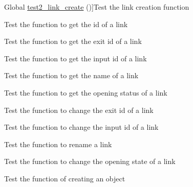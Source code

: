 \begin{DoxyRefList}
%
Global \hyperlink{link__test_8c_a24b5463da176c3e578b0a0fa8bb1f9f0}{test2\+\_\+link\+\_\+create} ()]Test the link creation function  
\item[\label{test__test000093}%
\Hypertarget{test__test000093}%
Global \hyperlink{link__test_8c_a0f967a1782dd7264e73ad428d22d125d}{test2\+\_\+link\+\_\+get\+\_\+id} ()]Test the function to get the id of a link  
\item[\label{test__test000098}%
\Hypertarget{test__test000098}%
Global \hyperlink{link__test_8c_a26e61cc0a08c97282384a56212168d5a}{test2\+\_\+link\+\_\+get\+\_\+id1} ()]Test the function to get the exit id of a link  
\item[\label{test__test000100}%
\Hypertarget{test__test000100}%
Global \hyperlink{link__test_8c_ad9c803361f84a47b5e3f0d475eeb28d0}{test2\+\_\+link\+\_\+get\+\_\+id2} ()]Test the function to get the input id of a link  
\item[\label{test__test000102}%
\Hypertarget{test__test000102}%
Global \hyperlink{link__test_8c_a4efc6cfcdc210e2803f9d285734c571e}{test2\+\_\+link\+\_\+get\+\_\+name} ()]Test the function to get the name of a link  
\item[\label{test__test000095}%
\Hypertarget{test__test000095}%
Global \hyperlink{link__test_8c_a52754541d1357c38da41b0c1b120d5ed}{test2\+\_\+link\+\_\+is\+\_\+open} ()]Test the function to get the opening status of a link  
\item[\label{test__test000086}%
\Hypertarget{test__test000086}%
Global \hyperlink{link__test_8c_acc401625c94cf6dc9ab66aa974804397}{test2\+\_\+link\+\_\+set\+\_\+id1} ()]Test the function to change the exit id of a link  
\item[\label{test__test000088}%
\Hypertarget{test__test000088}%
Global \hyperlink{link__test_8c_a3a6a81c8b408b2e438884cb3e4d533a3}{test2\+\_\+link\+\_\+set\+\_\+id2} ()]Test the function to change the input id of a link  
\item[\label{test__test000084}%
\Hypertarget{test__test000084}%
Global \hyperlink{link__test_8c_aa66c1e991620a5a758ba6e4d6b4a8b73}{test2\+\_\+link\+\_\+set\+\_\+name} ()]Test the function to rename a link  
\item[\label{test__test000090}%
\Hypertarget{test__test000090}%
Global \hyperlink{link__test_8c_a4f7f80db70fdda86df30c5e35c851d65}{test2\+\_\+link\+\_\+set\+\_\+open} ()]Test the function to change the opening state of a link  
\item[\label{test__test000104}%
\Hypertarget{test__test000104}%
Global \hyperlink{object__test_8c_add54ab5e33a1b0a93e9ddcf73591bd9f}{test2\+\_\+object\+\_\+create} ()]Test the function of creating an object  

\end{DoxyRefList}
